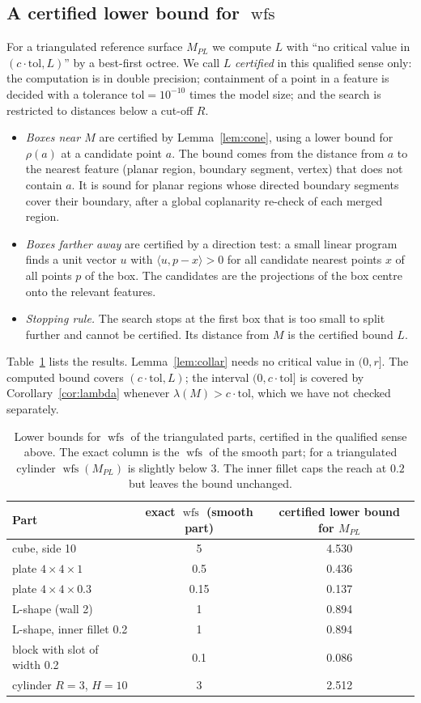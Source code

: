 \documentclass[preprint,12pt]{elsarticle}
\theoremstyle{definition}
\theoremstyle{remark}
\newcommand{\wfs}{\operatorname{wfs}}
\begin{document}
\subsection{A certified lower bound for $\wfs$}
For a triangulated reference surface $M_{PL}$ we compute $L$ with ``no critical value in $(c\cdot\mathrm{tol},L)$''
by a best-first octree. We call $L$ \emph{certified} in this qualified sense only: the computation is in double
precision; containment of a point in a feature is decided with a tolerance $\mathrm{tol}=10^{-10}$ times the model
size; and the search is restricted to distances below a cut-off $R$.
\begin{itemize}
\item \emph{Boxes near $M$} are certified by Lemma~\ref{lem:cone}, using a lower bound for $\rho(a)$ at a
candidate point $a$. The bound comes from the distance from $a$ to the nearest feature (planar region, boundary
segment, vertex) that does not contain $a$. It is sound for planar regions whose directed boundary segments cover
their boundary, after a global coplanarity re-check of each merged region.
\item \emph{Boxes farther away} are certified by a direction test: a small linear program finds a unit vector $u$
with $\langle u,p-x\rangle>0$ for all candidate nearest points $x$ of all points $p$ of the box. The candidates
are the projections of the box centre onto the relevant features.
\item \emph{Stopping rule.} The search stops at the first box that is too small to split further and cannot be
certified. Its distance from $M$ is the certified bound $L$.
\end{itemize}
Table~\ref{tab:wfs} lists the results. Lemma~\ref{lem:collar} needs no critical value in $(0,r]$. The computed
bound covers $(c\cdot\mathrm{tol},L)$; the interval $(0,c\cdot\mathrm{tol}]$ is covered by
Corollary~\ref{cor:lambda} whenever $\lambda(M)>c\cdot\mathrm{tol}$, which we have not checked separately.

\begin{table}[h]
\centering
\begin{tabular}{lcc}
\toprule
Part & exact $\wfs$ (smooth part) & certified lower bound for $M_{PL}$ \\
\midrule
cube, side 10 & 5 & 4.530 \\
plate $4\times4\times1$ & 0.5 & 0.436 \\
plate $4\times4\times0.3$ & 0.15 & 0.137 \\
L-shape (wall 2) & 1 & 0.894 \\
L-shape, inner fillet 0.2 & 1 & 0.894 \\
block with slot of width 0.2 & 0.1 & 0.086 \\
cylinder $R=3$, $H=10$ & 3 & 2.512 \\
\bottomrule
\end{tabular}
\caption{Lower bounds for $\wfs$ of the triangulated parts, certified in the qualified sense above. The exact
column is the $\wfs$ of the smooth part; for a triangulated cylinder $\wfs(M_{PL})$ is slightly below $3$. The inner
fillet caps the reach at $0.2$ but leaves the bound unchanged.}\label{tab:wfs}
\end{table}
\end{document}
